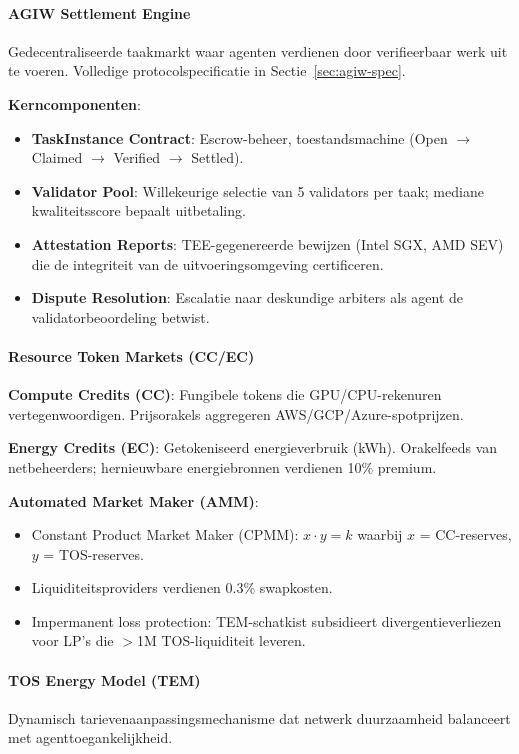 \documentclass[11pt]{article}
\begin{document}
\paragraph{AGIW Settlement Engine}
Gedecentraliseerde taakmarkt waar agenten verdienen door verifieerbaar werk uit te voeren. Volledige protocolspecificatie in Sectie~\ref{sec:agiw-spec}.

\textbf{Kerncomponenten}:
\begin{itemize}[noitemsep]
  \item \textbf{TaskInstance Contract}: Escrow-beheer, toestandsmachine (Open $\to$ Claimed $\to$ Verified $\to$ Settled).
  \item \textbf{Validator Pool}: Willekeurige selectie van 5 validators per taak; mediane kwaliteitsscore bepaalt uitbetaling.
  \item \textbf{Attestation Reports}: TEE-gegenereerde bewijzen (Intel SGX, AMD SEV) die de integriteit van de uitvoeringsomgeving certificeren.
  \item \textbf{Dispute Resolution}: Escalatie naar deskundige arbiters als agent de validatorbeoordeling betwist.
\end{itemize}

\paragraph{Resource Token Markets (CC/EC)}
\textbf{Compute Credits (CC)}: Fungibele tokens die GPU/CPU-rekenuren vertegenwoordigen. Prijsorakels aggregeren AWS/GCP/Azure-spotprijzen.

\textbf{Energy Credits (EC)}: Getokeniseerd energieverbruik (kWh). Orakelfeeds van netbeheerders; hernieuwbare energiebronnen verdienen 10\% premium.

\textbf{Automated Market Maker (AMM)}:
\begin{itemize}[noitemsep]
  \item Constant Product Market Maker (CPMM): $x \cdot y = k$ waarbij $x$ = CC-reserves, $y$ = TOS-reserves.
  \item Liquiditeitsproviders verdienen 0.3\% swapkosten.
  \item Impermanent loss protection: TEM-schatkist subsidieert divergentieverliezen voor LP's die $>$1M TOS-liquiditeit leveren.
\end{itemize}

\paragraph{TOS Energy Model (TEM)}
Dynamisch tarievenaanpassingsmechanisme dat netwerk duurzaamheid balanceert met agenttoegankelijkheid.
\end{document}
